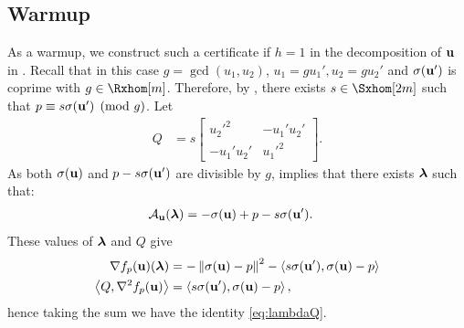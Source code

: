 \documentclass[final,onefignum,onetabnum]{siamart220329}
\begin{document}
\subsection{Warmup}
As a warmup, we construct such a certificate if $h=1$ in the decomposition of
$\boldsymbol{\mathbf{u}}$ in . Recall that in this case $g = \gcd(u_1, u_2)$,
$u_1 = gu_1', u_2 = gu_2'$ and $\sigma(\boldsymbol{\mathbf{u}}')$ is coprime with
$g \in \Rxhom[m]$. Therefore, by , there exists
$s \in \Sxhom[2m]$ such that $p \equiv s \sigma(\boldsymbol{\mathbf{u}}') \pmod{g}$. Let
\begin{align*}
  Q & = s
      \begin{bmatrix}
    {u_2'}^2 & -u_1'u_2'\\
    -u_1'u_2' & {u_1'}^2
  \end{bmatrix}.
\end{align*}
As both $\sigma(\boldsymbol{\mathbf{u}})$ and $p - s \sigma(\boldsymbol{\mathbf{u}}')$ are divisible by $g$,
 implies that there exists $\boldsymbol{\mathbf{\lambda}}$ such that:
\begin{align*}
  \mathcal{A}_{\boldsymbol{\mathbf{u}}}(\boldsymbol{\mathbf{\lambda}}) & = -\sigma(\boldsymbol{\mathbf{u}}) + p - s \sigma(\boldsymbol{\mathbf{u}}').
\end{align*}
These values of $\boldsymbol{\mathbf{\lambda}}$ and $Q$ give
\begin{align*}
  \nabla f_p(\boldsymbol{\mathbf{u}})(\boldsymbol{\mathbf{\lambda}})
  & = -\left\lVert \sigma(\boldsymbol{\mathbf{u}}) - p \right\lVert^2
    - \left\langle s\sigma(\boldsymbol{\mathbf{u}}'), \sigma(\boldsymbol{\mathbf{u}}) - p \right\rangle\\
  \left\langle Q, \nabla^2 f_p(\boldsymbol{\mathbf{u}}) \right\rangle
  &= \left\langle s \sigma(\boldsymbol{\mathbf{u}}'), \sigma(\boldsymbol{\mathbf{u}}) - p \right\rangle,
\end{align*}
hence taking the sum we have the identity \eqref{eq:lambdaQ}.
\end{document}
